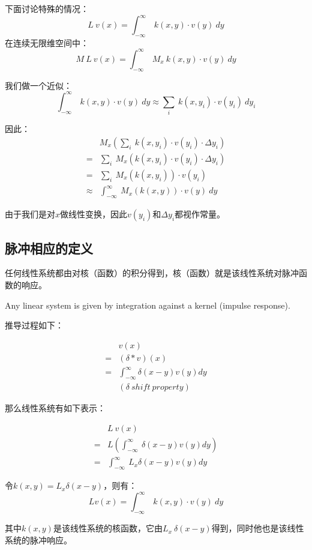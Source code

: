 下面讨论特殊的情况：
$$
	L\ v(x)=\int_{-\infty}^\infty\ k(x,y)\cdot v(y)\ dy
$$
在连续无限维空间中：
$$
	M\ L\ v(x)= \int_{-\infty}^\infty\ M_x\ k(x,y)\cdot v(y)\ dy
$$

我们做一个近似：
$$
	\int_{-\infty}^\infty\ k(x,y)\cdot v(y)\ dy\approx \sum\limits_i\ k(x,y_i)\cdot v(y_i)\ dy_i
$$

因此：
\begin{align*}
	        & M_x(\sum\limits_i\ k(x,y_i)\cdot v(y_i)\cdot \Delta y_i) \\
	=       & \sum\limits_i\ M_x(k(x,y_i)\cdot v(y_i)\cdot \Delta y_i) \\
	=       & \sum\limits_i\ M_x(k(x,y_i))\cdot v(y_i)                 \\
	\approx & \int_{-\infty}^\infty\ M_x(k(x,y))\cdot v(y)\ dy
\end{align*}

由于我们是对$x$做线性变换，因此$v(y_i)$和$\Delta y_i$都视作常量。
\subsection{脉冲相应的定义}
任何线性系统都由对核（函数）的积分得到，核（函数）就是该线性系统对脉冲函数的响应。

Any linear system is given by integration against a kernel (impulse response).

推导过程如下：

\begin{align*}
	  & v(x)                                     \\
	= & (\delta * v)(x)                          \\
	= & \int_{-\infty}^{\infty}\delta(x-y)v(y)dy \\
	  & (\delta\ shift\ property)
\end{align*}

那么线性系统有如下表示：

\begin{align*}
	  & L\ v(x)                                          \\
	= & L( \int_{-\infty}^{\infty}\ \delta(x-y)v(y)dy  ) \\
	= & \int_{-\infty}^{\infty}\ L_x\delta(x-y)v(y)dy
\end{align*}

令$k(x,y) = L_x\delta(x-y)$，则有：
$$
	Lv(x) = \int_{-\infty}^{\infty}\ k(x,y)\cdot v(y)\ dy
$$

其中$k(x,y)$是该线性系统的核函数，它由$L_x\ \delta(x−y)$得到，同时他也是该线性系统的脉冲响应。

